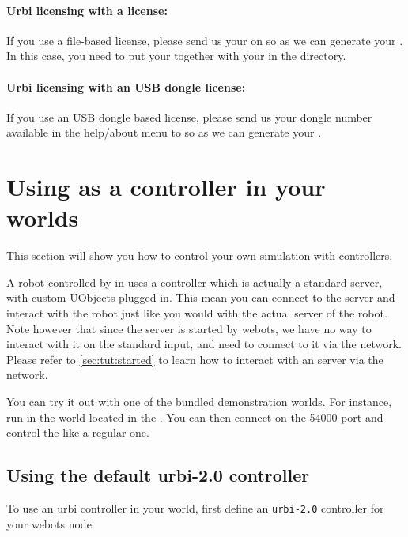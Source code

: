 \paragraph{Urbi licensing with a \webotskey \webots license:}

If you use a file-based \webots license, please send us your
\webotskey on \contactemail so as we can generate your \urbikey. In
this case, you need to put your \webotskey together with your \urbikey
in the \webotskeydir directory.

\paragraph{Urbi licensing with an USB dongle \webots license:}

If you use an USB dongle based license, please send us your dongle
number available in the help/about \webots menu to \contactemail so as
we can generate your \urbikey.

\section{Using \urbi as a controller in your \webots worlds}

This section will show you how to control your own simulation with
\urbi controllers.

A robot controlled by \urbi in \webots uses a controller which is
actually a standard \urbi server, with custom UObjects plugged
in. This mean you can connect to the \urbi server and interact with
the robot just like you would with the actual \urbi server of the
robot. Note however that since the \urbi server is started by webots,
we have no way to interact with it on the standard input, and need to
connect to it via the network. Please refer to
\autoref{sec:tut:started} to learn how to interact with an \urbi
server via the network.

You can try it out with one of the bundled demonstration worlds. For
instance, run in \webots the  world
located in the \webotsworldsdir. You can then connect on the 54000
port and control the \aibo like a regular one.

\subsection{Using the default urbi-2.0 controller}

To use an urbi controller in your \webots world, first define an
\verb+urbi-2.0+ controller for your webots node:

